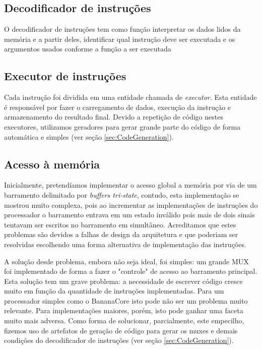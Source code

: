 \documentclass[11pt]{report}
\begin{document}
\subsection{Decodificador de instruções}
\label{sec:InstructionDecoder}
O decodificador de instruções tem como função interpretar os dados lidos da memória e a partir deles, identificar qual instrução deve ser executada e os argumentos usados conforme a função a ser executada 

\subsection{Executor de instruções}
\label{sec:InstructionExecutor}
Cada instrução foi dividida em uma entidade chamada de \emph{executor}. Esta entidade é responsável por fazer o carregamento de dados, execução da instrução e armazenamento do resultado final. Devido a repetição de código nestes executores, utilizamos geradores para gerar grande parte do código de forma automática e simples (ver seção \ref{sec:CodeGeneration}).

\subsection{Acesso à memória}
\label{sec:MemoryAccess}

Inicialmente, pretendíamos implementar o acesso global a memória por via de um barramento delimitado por \emph{buffers tri-state}, contudo, esta implementação se mostrou muito complexa, pois ao incrementar as implementações de instruções do processador o barramento entrava em um estado inválido pois mais de dois sinais tentavam ser escritos no barramento em simultâneo. Acreditamos que estes problemas são devidos a falhas de design da arquitetura e que poderiam ser resolvidas escolhendo uma forma alternativa de implementação das instruções.

A solução desde problema, embora não seja ideal, foi simples: um grande MUX foi implementado de forma a fazer o "controle" de acesso ao barramento principal. Esta solução tem um grave problema: a necessidade de escrever código cresce muito em função da quantidade de instruções implementadas. Para um processador simples como o BananaCore isto pode não ser um problema muito relevante. Para implementações maiores, porém, isto pode ganhar uma faceta muito mais adversa. Como forma de solucionar, parcialmente, este empecilho, fizemos uso de artefatos de geração de código para gerar os muxes e demais condições do decodificador de instruções (ver seção \ref{sec:CodeGeneration}).
\end{document}
